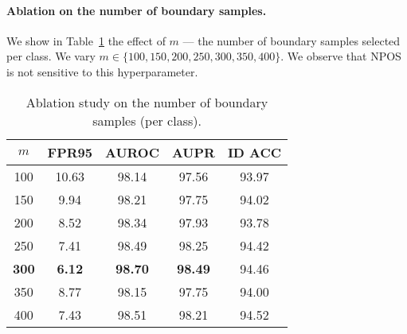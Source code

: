 \paragraph{Ablation on the number of boundary samples.} We show in Table~\ref{tab:m_ablation} the effect of $m$ --- the number of boundary samples selected per class. We vary $m\in\{100, 150, 200, 250, 300, 350, 400\}$. We observe that NPOS is not sensitive to this hyperparameter.
\begin{table}[h]
    \centering
    \small 
    \caption{Ablation study on the number of boundary samples (per class).}
      \begin{tabular}{c|cccc}
      \toprule
      $m$& FPR95 & AUROC & AUPR  & ID ACC  \\
      \midrule
      100   & 10.63  & 98.14  & 97.56  & 93.97  \\
      150   & 9.94  & 98.21  & 97.75  & 94.02  \\
      200   & 8.52  & 98.34  & 97.93  & 93.78  \\
      250   & 7.41  & 98.49  & 98.25  & 94.42  \\
      \textbf{300}   & \textbf{6.12} & \textbf{98.70} & \textbf{98.49} & 94.46 \\
      350   & 8.77  & 98.15  & 97.75  & 94.00  \\
      400   & 7.43  & 98.51  & 98.21  & 94.52  \\
      \bottomrule
      \end{tabular}\label{tab:m_ablation}\vspace{-1em}
  \end{table}

\vspace{-0.2cm}
